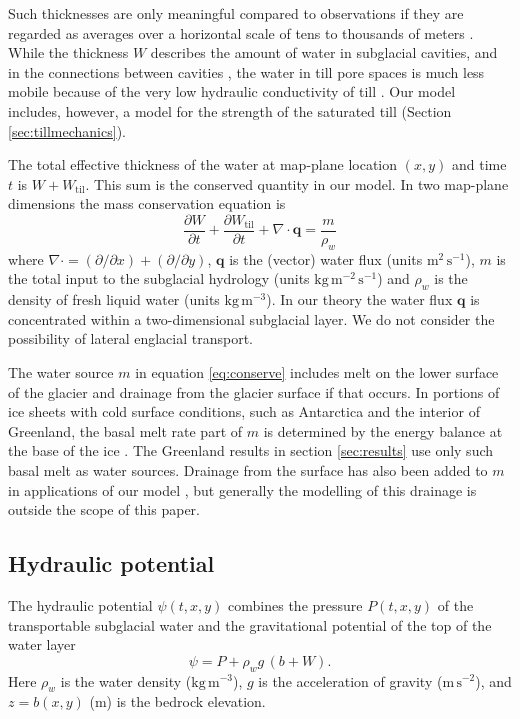 \documentclass[gmd]{copernicus}   %
\newcommand{\text}{\textrm}
\newcommand\bq{\mathbf{q}}
\newcommand{\Div}{\nabla\cdot}
\newcommand{\Wtil}{W_{\text{til}}}
\begin{document}
Such thicknesses are only meaningful compared to observations if they are regarded as averages over a horizontal scale of tens to thousands of meters \citep{FlowersClarke2002_theory}.  While the thickness $W$ describes the amount of water in subglacial cavities, and in the connections between cavities \citep{Kamb1987}, the water in till pore spaces is much less mobile because of the very low hydraulic conductivity of till \citep{LingleBrown1987,TrufferEchelmeyerHarrison2001,Tulaczyketal2000}.  Our model includes, however, a model for the strength of the saturated till (Section \ref{sec:tillmechanics}).

The total effective thickness of the water at map-plane location $(x,y)$ and time $t$ is $W + \Wtil$.  This sum is the conserved quantity in our model.  In two map-plane dimensions the mass conservation equation is \citep[compare][]{Clarke05}
\begin{equation} \label{eq:conserve}
\frac{\partial W}{\partial t} + \frac{\partial \Wtil}{\partial t} + \Div \bq = \frac{m}{\rho_w}
\end{equation}
where $\Div = (\partial/\partial x) + (\partial/\partial y)$, $\bq$ is the (vector) water flux (units $\text{m}^2\,\text{s}^{-1}$), $m$ is the total input to the subglacial hydrology (units $\text{kg}\,\text{m}^{-2}\,\text{s}^{-1}$) and $\rho_w$ is the density of fresh liquid water (units $\text{kg}\,\text{m}^{-3}$).  In our theory the water flux $\bq$ is concentrated within a two-dimensional subglacial layer.  We do not consider the possibility of lateral englacial transport.

The water source $m$ in equation \eqref{eq:conserve} includes melt on the lower surface of the glacier and drainage from the glacier surface if that occurs.  In portions of ice sheets with cold surface conditions, such as Antarctica and the interior of Greenland, the basal melt rate part of $m$ is determined by the energy balance at the base of the ice \citep{AschwandenBuelerKhroulevBlatter}.  The Greenland results in section \ref{sec:results} use only such basal melt as water sources.  Drainage from the surface has also been added to $m$ in applications of our model \citep{vanPeltthesis}, but generally the modelling of this drainage is outside the scope of this paper.

\subsection{Hydraulic potential}  The  hydraulic potential $\psi(t,x,y)$ combines the pressure $P(t,x,y)$ of the transportable subglacial water and the gravitational potential of the top of the water layer \citep{Goelleretal2013,Hewittetal2012}
\begin{equation} \label{eq:potential}
\psi = P + \rho_w g\, (b+W).
\end{equation}
Here $\rho_w$ is the water density ($\text{kg}\,\text{m}^{-3}$), $g$ is the acceleration of gravity ($\text{m}\,\text{s}^{-2}$), and $z=b(x,y)$ ($\text{m}$) is the bedrock elevation.
\end{document}
